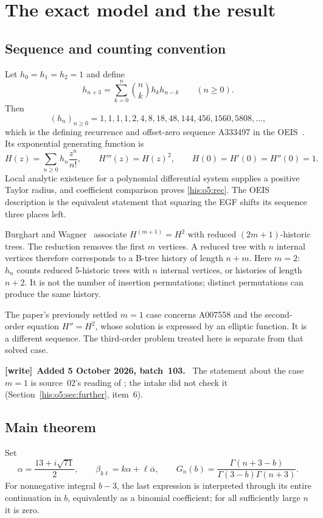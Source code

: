 \documentclass[11pt]{article}
\theoremstyle{remark}\newtheorem{remark}[theorem]{Remark}
\numberwithin{equation}{section}
\newenvironment{writenote}[1][]{\par\smallskip\begingroup\small
 \noindent\textbf{[write]}\if\relax\detokenize{#1}\relax\else~\textbf{#1.}\fi\ }%
 {\par\endgroup\smallskip}
\begin{document}
\section{The exact model and the result}\label{his:o5:sec:model}
\subsection{Sequence and counting convention}
Let $h_0=h_1=h_2=1$ and define
\begin{equation}\label{his:o5:rec}
h_{n+3}=\sum_{k=0}^{n}\binom nk h_kh_{n-k}\qquad(n\ge0).
\end{equation}
Then
\[
(h_n)_{n\ge0}=1,1,1,1,2,4,8,18,48,144,456,1560,5808,\ldots,
\]
which is the defining recurrence and offset-zero sequence A333497
in the OEIS~\cite{oeis}. Its exponential generating function is
\begin{equation}\label{his:o5:ode}
H(z)=\sum_{n\ge0}h_n\frac{z^n}{n!},\qquad
H'''(z)=H(z)^2,\qquad H(0)=H'(0)=H''(0)=1.
\end{equation}
Local analytic existence for a polynomial differential system supplies a
positive Taylor radius, and coefficient comparison proves \eqref{his:o5:rec}.
The OEIS description is the equivalent statement that squaring the EGF
shifts its sequence three places left.

Burghart and Wagner~\cite[Section 4, equation (4)]{bw2026} associate
$H^{(m+1)}=H^2$ with reduced $(2m+1)$-historic trees. The reduction removes
the first $m$ vertices. A reduced tree with $n$ internal vertices therefore
corresponds to a B-tree history of length $n+m$. Here $m=2$: $h_n$ counts
reduced 5-historic trees with $n$ internal vertices, or histories of length
$n+2$. It is not the number of insertion permutations; distinct permutations
can produce the same history.

The paper's previously settled $m=1$ case concerns A007558 and the
second-order equation $H''=H^2$, whose solution is expressed by an elliptic
function. It is a different sequence. The third-order problem treated here is separate from that solved case.
\begin{writenote}[Added 5 October 2026, batch~103]
The statement about the case $m=1$ is source~02's reading of \cite{bw2026}; the intake did not check it (Section~\ref{his:o5:sec:further}, item~6).
\end{writenote}


\subsection{Main theorem}
Set
\begin{equation}\label{his:o5:alpha}
\alpha=\frac{13+i\sqrt{71}}2,\qquad
\beta_{k\ell}=k\alpha+\ell\overline\alpha,\qquad
G_n(b)=\frac{\Gamma(n+3-b)}{\Gamma(3-b)\Gamma(n+3)}.
\end{equation}
For nonnegative integral $b-3$, the last expression is interpreted through
its entire continuation in $b$, equivalently as a binomial coefficient;
for all sufficiently large $n$ it is zero.
\end{document}
